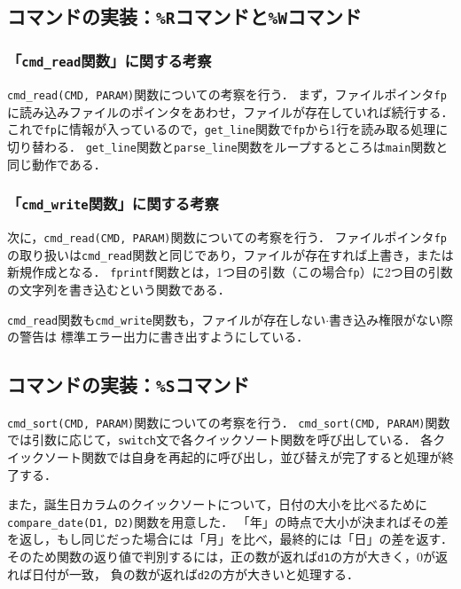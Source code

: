 \documentclass[autodetect-engine,dvi=dvipdfmx,ja=standard,
               a4j,11pt]{bxjsarticle}
\begin{document}
\subsection{コマンドの実装：\texttt{\%R}コマンドと\texttt{\%W}コマンド}

\subsubsection{「\texttt{cmd\_read}関数」に関する考察}

\verb|cmd_read(CMD, PARAM)|関数についての考察を行う．
まず，ファイルポインタ\verb|fp|に読み込みファイルのポインタをあわせ，ファイルが存在していれば続行する．
これで\verb|fp|に情報が入っているので，\verb|get_line|関数で\verb|fp|から1行を読み取る処理に切り替わる．
\verb|get_line|関数と\verb|parse_line|関数をループするところは\verb|main|関数と同じ動作である．

\subsubsection{「\texttt{cmd\_write}関数」に関する考察}

次に，\verb|cmd_read(CMD, PARAM)|関数についての考察を行う．
ファイルポインタ\verb|fp|の取り扱いは\verb|cmd_read|関数と同じであり，ファイルが存在すれば上書き，または新規作成となる．
\verb|fprintf|関数とは，1つ目の引数（この場合\verb|fp|）に2つ目の引数の文字列を書き込むという関数である．

\verb|cmd_read|関数も\verb|cmd_write|関数も，ファイルが存在しない$\cdot$書き込み権限がない際の警告は
標準エラー出力に書き出すようにしている．

\subsection{コマンドの実装：\texttt{\%S}コマンド}

\verb|cmd_sort(CMD, PARAM)|関数についての考察を行う．
\verb|cmd_sort(CMD, PARAM)|関数では引数に応じて，\verb|switch|文で各クイックソート関数を呼び出している．
各クイックソート関数では自身を再起的に呼び出し，並び替えが完了すると処理が終了する．

また，誕生日カラムのクイックソートについて，日付の大小を比べるために\verb|compare_date(D1, D2)|関数を用意した．
「年」の時点で大小が決まればその差を返し，もし同じだった場合には「月」を比べ，最終的には「日」の差を返す．
そのため関数の返り値で判別するには，正の数が返れば\verb|d1|の方が大きく，$0$が返れば日付が一致，
負の数が返れば\verb|d2|の方が大きいと処理する．
\end{document}
